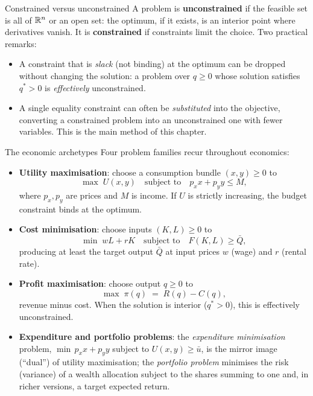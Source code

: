 \begin{rulebox}{Constrained versus unconstrained}
A problem is \textbf{unconstrained} if the feasible
set is all of $\mathbb{R}^n$ or an open set: the optimum, if it exists, is an
interior point where derivatives vanish. It is \textbf{constrained} if constraints limit the choice. Two practical
remarks:
\begin{itemize}[leftmargin=1.6em,itemsep=0.3ex]
  \item A constraint that is \emph{slack} (not binding) at the optimum can
        be dropped without changing the solution: a problem over $q \ge 0$
        whose solution satisfies $q^{*} > 0$ is \emph{effectively}
        unconstrained.
  \item A single equality constraint can often be \emph{substituted} into
        the objective, converting a constrained problem into an
        unconstrained one with fewer variables. This is the main
        method of this chapter.
\end{itemize}
\end{rulebox}

\begin{rulebox}{The economic archetypes}
Four problem families recur throughout economics:
\begin{itemize}[leftmargin=1.6em,itemsep=0.3ex]
  \item \textbf{Utility maximisation}: choose a
        consumption bundle $(x,y)\ge 0$ to
        \[
          \max\; U(x,y) \quad\text{subject to}\quad p_x x + p_y y \le M ,
        \]
        where $p_x,p_y$ are prices and $M$ is income. If $U$ is strictly
        increasing, the budget constraint binds at the optimum.
  \item \textbf{Cost minimisation}: choose
        inputs $(K,L)\ge 0$ to
        \[
          \min\; wL + rK \quad\text{subject to}\quad F(K,L) \ge \bar{Q},
        \]
        producing at least the target output $\bar{Q}$ at input prices
        $w$ (wage) and $r$ (rental rate).
  \item \textbf{Profit maximisation}: choose
        output $q \ge 0$ to
        \[
          \max\; \pi(q) \;=\; R(q) - C(q),
        \]
        revenue minus cost. When the solution is interior ($q^{*}>0$),
        this is effectively unconstrained.
  \item \textbf{Expenditure and portfolio problems}: the
        \emph{expenditure minimisation} problem, $\min\, p_x x + p_y y$ subject to
        $U(x,y) \ge \bar{u}$, is the mirror image (``dual'') of utility
        maximisation; the \emph{portfolio problem} minimises the risk
        (variance) of a wealth allocation subject to the shares summing
        to one and, in richer versions, a target expected return.
\end{itemize}
\end{rulebox}

